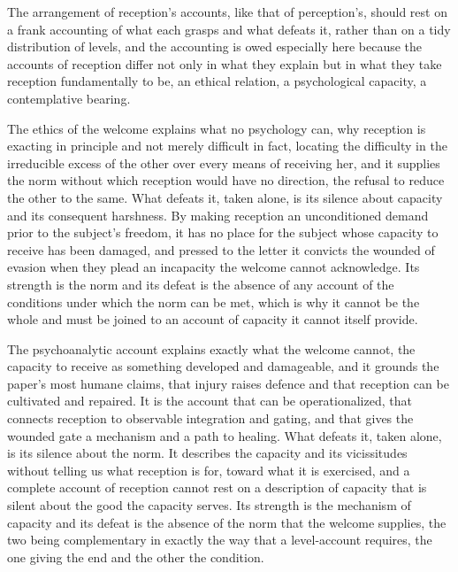 The arrangement of reception's accounts, like that of perception's, should rest on a frank accounting of what each grasps and what defeats it, rather than on a tidy distribution of levels, and the accounting is owed especially here because the accounts of reception differ not only in what they explain but in what they take reception fundamentally to be, an ethical relation, a psychological capacity, a contemplative bearing.

The ethics of the welcome explains what no psychology can, why reception is exacting in principle and not merely difficult in fact, locating the difficulty in the irreducible excess of the other over every means of receiving her, and it supplies the norm without which reception would have no direction, the refusal to reduce the other to the same. What defeats it, taken alone, is its silence about capacity and its consequent harshness. By making reception an unconditioned demand prior to the subject's freedom, it has no place for the subject whose capacity to receive has been damaged, and pressed to the letter it convicts the wounded of evasion when they plead an incapacity the welcome cannot acknowledge. Its strength is the norm and its defeat is the absence of any account of the conditions under which the norm can be met, which is why it cannot be the whole and must be joined to an account of capacity it cannot itself provide.

The psychoanalytic account explains exactly what the welcome cannot, the capacity to receive as something developed and damageable, and it grounds the paper's most humane claims, that injury raises defence and that reception can be cultivated and repaired. It is the account that can be operationalized, that connects reception to observable integration and gating, and that gives the wounded gate a mechanism and a path to healing. What defeats it, taken alone, is its silence about the norm. It describes the capacity and its vicissitudes without telling us what reception is for, toward what it is exercised, and a complete account of reception cannot rest on a description of capacity that is silent about the good the capacity serves. Its strength is the mechanism of capacity and its defeat is the absence of the norm that the welcome supplies, the two being complementary in exactly the way that a level-account requires, the one giving the end and the other the condition.

